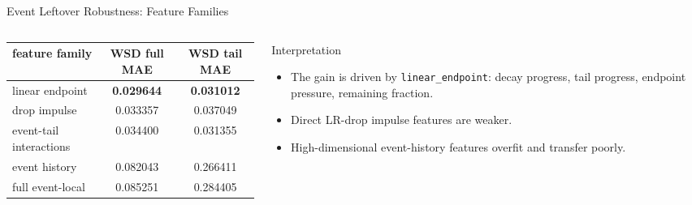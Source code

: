 \documentclass[fontset=fandol,aspectratio=169,10pt]{ctexbeamer}
\begin{document}
\begin{frame}{Event Leftover Robustness: Feature Families}
  \begin{columns}[T,onlytextwidth]
    \begin{column}{0.52\textwidth}
      \begin{table}
        \centering
        \scriptsize
        \begin{tabular}{lcc}
          \toprule
          feature family & WSD full MAE & WSD tail MAE\\
          \midrule
          linear endpoint & \textbf{0.029644} & \textbf{0.031012}\\
          drop impulse & 0.033357 & 0.037049\\
          event-tail interactions & 0.034400 & 0.031355\\
          event history & 0.082043 & 0.266411\\
          full event-local & 0.085251 & 0.284405\\
          \bottomrule
        \end{tabular}
      \end{table}
    \end{column}
    \begin{column}{0.46\textwidth}
      \begin{block}{Interpretation}
        \begin{itemize}
          \item The gain is driven by \texttt{linear\_endpoint}: decay progress, tail progress, endpoint pressure, remaining fraction.
          \item Direct LR-drop impulse features are weaker.
          \item High-dimensional event-history features overfit and transfer poorly.
        \end{itemize}
      \end{block}
    \end{column}
  \end{columns}
\end{frame}
\end{document}
